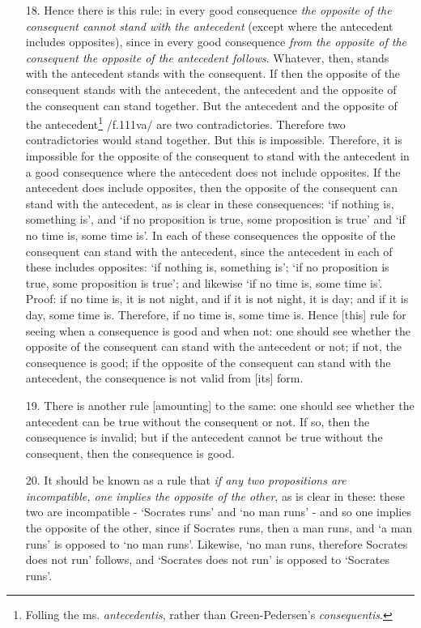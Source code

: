 \begin{enumerate}
\item[18.] Hence there is this rule: in every good consequence \textit{the opposite of the consequent cannot stand with the antecedent} (except where the antecedent includes opposites), since in every good consequence \textit{from the opposite of the consequent the opposite of the antecedent follows}. Whatever, then, stands with the antecedent stands with the consequent. If then the opposite of the consequent stands with the antecedent, the antecedent and the opposite of the consequent can stand together. But the antecedent and the opposite of the antecedent\footnote{Folling the ms. \textit{antecedentis}, rather than Green-Pedersen's \textit{consequentis}.} /f.111va/ are two contradictories. Therefore two contradictories would stand together. But this is impossible. Therefore, it is impossible for the opposite of the consequent to stand with the antecedent in a good consequence where the antecedent does not include opposites. If the antecedent does include opposites, then the opposite of the consequent can stand with the antecedent, as is clear in these consequences: `if nothing is, something is', and `if no proposition is true, some proposition is true' and `if no time is, some time is'. In each of these consequences the opposite of the consequent can stand with the antecedent, since the antecedent in each of these includes opposites: `if nothing is, something is'; `if no proposition is true, some proposition is true'; and likewise `if no time is, some time is'. Proof: if no time is, it is not night, and if it is not night, it is day; and if it is day, some time is. Therefore, if no time is, some time is. Hence [this] rule for seeing when a consequence is good and when not: one should see whether the opposite of the consequent can stand with the antecedent or not; if not, the consequence is good; if the opposite of the consequent can stand with the antecedent, the consequence is not valid from [its] form.
\item[19.] There is another rule [amounting] to the same: one should see whether the antecedent can be true without the consequent or not. If so, then the consequence is  invalid; but if the antecedent cannot be true without the consequent, then the consequence is good.
\item[20.] It should be known as a rule that \textit{if any two propositions are incompatible, one implies the opposite of the other}, as is clear in these: these two are incompatible - `Socrates runs' and `no man runs' - and so one implies the opposite of the other, since if Socrates runs, then a man runs, and `a man runs' is opposed to `no man runs'. Likewise, `no man runs, therefore Socrates does not run' follows, and `Socrates does not run' is opposed to `Socrates runs'.

\end{enumerate}
